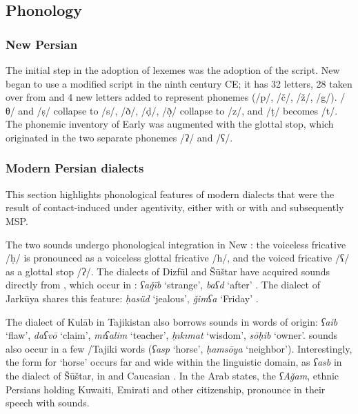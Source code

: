 \documentclass[output=paper]{langsci/langscibook}
\begin{document}
\subsection{Phonology}


\subsubsection{New Persian}

The initial step in the adoption of  lexemes was the adoption of the  script. New  began to use a modified  script in the ninth century CE; it has 32 letters, 28 taken over from  and 4 new letters added to represent  phonemes (/p/, /č/, /ž/, /g/).  /θ/ and /ṣ/ collapse to  /s/,  /ð/, /ḍ/, /ð̣/ collapse to  /z/, and  /ṭ/ becomes  /t/. The phonemic inventory of Early   was augmented with the glottal stop, which originated in the two separate  phonemes /ʔ/ and /ʕ/.

\subsubsection{Modern Persian dialects}

This section highlights phonological features of modern  dialects that were the result of contact-induced  under  agentivity, either with  or with   and subsequently MSP.


The two   sounds undergo phonological integration in New : the voiceless  fricative /ḥ/ is pronounced as a voiceless glottal fricative /h/, and the voiced  fricative /ʕ/ as a glottal stop /ʔ/. The dialects of Dizfūl and Šūštar have acquired  sounds directly from , which occur in  : \textit{ʕaǧīb} ‘strange’, \textit{baʕd} ‘after’ \citep{MacKinnon2015}. The dialect of Jarkūya shares this feature: \textit{ḥasüd} ‘jealous’, \textit{ǧimʕa} ‘Friday’ \citep{Borjian2008}.

The dialect of Kulāb in Tajikistan also borrows   sounds in words of  origin: \textit{ʕaib} ‘flaw’, \textit{daʕvō} ‘claim’, \textit{mıʕalim} ‘teacher’, \textit{ḥıkımat} ‘wisdom’, \textit{sōḥib} ‘owner’.   sounds also occur in a few /Tajiki words (\textit{ʕasp} ‘horse’, \textit{ḥamsōya} ‘neighbor’). Interestingly, the  form for ‘horse’ occurs far and wide within the  linguistic domain, as \textit{ʕasb} in the  dialect of Šūštar, in  and Caucasian . In the Arab  states, the \textit{ʕAǧam}, ethnic Persians holding Kuwaiti, Emirati and other  citizenship, pronounce   in their  speech with  sounds.
\end{document}
